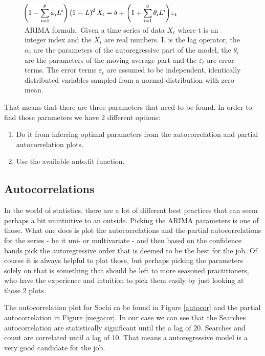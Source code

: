 \documentclass[minf,twoside,singlespacing,parskip,notimes,deptreport]{infthesis} %
\begin{document}
\begin{figure}[h!]
\begin{center}
\includegraphics[width=0.7\textwidth]{ARIMA}
\end{center}
\caption{ARIMA formula. Given a time series of data $X_t$ where t is an integer index and the $X_t$ are real numbers. L is the lag operator, the $\alpha_i$ are the parameters of the autoregressive part of the model, the $\theta_i$ are the parameters of the moving average part and the $\varepsilon_t$ are error terms. The error terms $\varepsilon_t$ are assumed to be independent, identically distributed variables sampled from a normal distribution with zero mean.
}
\label{arima}
\end{figure}

That means that there are three parameters that need to be found. In order to find those parameters we have 2 different options:
\begin{enumerate}
\item Do it from inferring optimal parameters from the autocorrelation and partial autocorrelation plots.
\item Use the available auto.fit function.
\end{enumerate}

\subsection{Autocorrelations}

In the world of statistics, there are a lot of different best practices that can seem perhaps a bit unintuitive to an outside. Picking the ARIMA parameters is one of those. What one does is plot the autocorrelations and the partial autocorrelations for the series - be it uni- or multivariate - and then based on the confidence bands pick the autoregressive order that is deemed to be the best for the job. Of course it is always helpful to plot those, but perhaps picking the parameters solely on that is something that should be left to more seasoned practitioners, who have the experience and intuition to pick them easily by just looking at those 2 plots. 


The autocorrelation plot for Sochi ca be found in Figure \ref{autocor}  and the partial autocorrelation in Figure \ref{megacor}. In our case we can see that the Searches autocorrelation are statistically significant until the a lag of 20. Searches and count are correlated until a lag of 10. That means a autoregressive model is a very good candidate for the job. 
\end{document}
